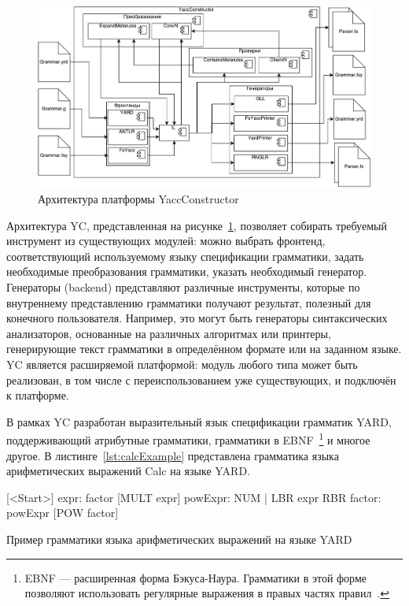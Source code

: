 \begin{figure}[h!]
\begin{center}
\includegraphics[width=\textwidth]{pics/YCArch.pdf}
\caption{Архитектура платформы YaccConstructor}
\label{fig:ycarch} 
\end{center}
\end{figure}

        
    Архитектура YC, представленная на рисунке~\ref{fig:ycarch}, позволяет собирать требуемый инструмент из существующих модулей: можно выбрать фронтенд, соответствующий используемому языку спецификации грамматики, задать необходимые преобразования грамматики, указать необходимый генератор. Генераторы (backend) представляют различные инструменты, которые по внутреннему представлению грамматики получают результат, полезный для конечного пользователя. Например, это могут быть генераторы синтаксических анализаторов, основанные на различных алгоритмах или принтеры, генерирующие текст грамматики в определённом формате или на заданном языке. YC является расширяемой платформой: модуль любого типа может быть реализован, в том числе с переиспользованием уже существующих, и подключён к платформе.  

    В рамках YC разработан выразительный язык спецификации грамматик YARD, поддерживающий атрибутные грамматики, грамматики в EBNF~\footnote{EBNF --- расширенная форма Бэкуса-Наура. Грамматики в этой форме позволяют использовать регулярные выражения в правых частях правил~\cite{EBNFISO}.} и многое другое. В листинге~\ref{lst:calcExample} представлена грамматика языка арифметических выражений Calc на языке YARD.  

\begin{listing}
    \begin{pyglist}[numbers=left,numbersep=5pt]
    
    [<Start>]
    expr: factor [MULT expr]
    powExpr: NUM | LBR expr RBR
    factor: powExpr [POW factor]
    
\end{pyglist}
\caption{Пример грамматики языка арифметических выражений на языке YARD}
\label{lst:calcExample}
\end{listing}


